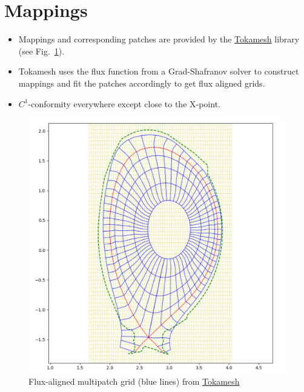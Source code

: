 \documentclass[presentation.tex]{subfiles}
\begin{document}
\section{Mappings}
\begin{itemize}
    \item Mappings and corresponding patches are provided by the \href{https://inria.hal.science/hal-01948060/document}{Tokamesh}
            library (see Fig.~\ref{fig:tokamesh_grid}).
    \item Tokamesh uses the flux function from a Grad-Shafranov solver to construct mappings and 
            fit the patches accordingly to get flux aligned grids.
    \item $C^1$-conformity everywhere except close to the X-point.
\end{itemize}
\begin{figure}
    \centering
    \includegraphics[width=0.8 \textwidth]{images/tokamesh_grid.png}
    \caption{Flux-aligned multipatch grid (blue lines) 
             from \href{https://inria.hal.science/hal-01948060/document}{Tokamesh}}
    \label{fig:tokamesh_grid}
\end{figure}
\end{document}
